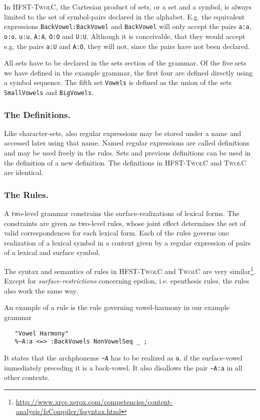 \documentclass[postprint]{flammie}
\begin{document}
In \textsc{HFST-TwolC}, the Cartesian product of sets, or a set and a
symbol, is always limited to the set of symbol-pairs declared in the
alphabet. E.g. the equivalent expressions \verb|BackVowel:BackVowel|
and \verb|BackVowel| will only accept the pairs \verb|a:a|,
\verb|o:o|, \verb|u:u|, \verb|A:A|, \verb|O:O| and
\verb|U:U|. Although it is conceivable, that they would accept
e.g. the pairs \verb|a:U| and \verb|A:O|, they will not, since the
pairs have not been declared.

All sets have to be declared in the sets section of the grammar. Of
the five sets we have defined in the example grammar, the first four
are defined directly using a symbol sequence. The fifth set
\verb|Vowels| is defined as the union of the sets \verb|SmallVowels|
and \verb|BigVowels|.

\subsubsection{The Definitions.}

Like character-sets, also regular expressions may be stored under a
name and accessed later using that name. Named regular expressions are
called definitions and may be used freely in the rules. Sets and
previous definitions can be used in the definition of a new
definition. The definitions in \textsc{HFST-TwolC} and \textsc{TwolC}
are identical.
 
\subsubsection{The Rules.}

A two-level grammar constrains the surface-realizations of lexical
forms. The constraints are given as two-level rules, whose joint
effect determines the set of valid correspondences for each lexical
form. Each of the rules governs one realization of a lexical symbol in
a context given by a regular expression of pairs of a lexical and
surface symbol.

The syntax and semantics of rules in \textsc{HFST-TwolC} and
\textsc{TwolC} are very
similar\footnote{\url{http://www.xrce.xerox.com/competencies/content-analysis/fsCompiler/fssyntax.html}}.
Except for \textit{surface-restrictions} concerning epsilon,
i.e. epenthesis rules, the rules also work the same way.

An example of a rule is the rule governing vowel-harmony in our example grammar
\begin{verbatim}
   "Vowel Harmony"
   %~A:a <=> :BackVowels NonVowelSeq _ ;
\end{verbatim}
It states that the archphoneme \verb|~A| has to be realized as
\verb|a|, if the surface-vowel immediately preceding it is a
back-vowel. It also disallows the pair \verb|~A:a| in all other
contexts.
\end{document}
